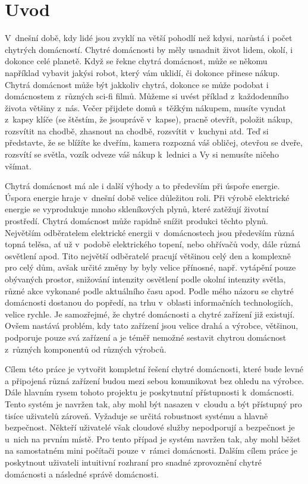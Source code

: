 \chapter{Uvod}

V~dnešní době, kdy lidé jsou zvyklí na větší pohodlí než kdysi, narůstá i počet chytrých domácností.
Chytré domácnosti by měly usnadnit život lidem, okolí, i dokonce celé planetě.
Když se řekne chytrá domácnost, může se někomu například vybavit jakýsi robot, který vám uklidí, či dokonce přinese nákup.
Chytrá domácnost může být jakkoliv chytrá, dokonce se může podobat i domácnostem z~různých sci-fi filmů.
Můžeme si uvést příklad z~každodenního života většiny z~nás.
Večer přijdete domů s~těžkým nákupem, musíte vyndat z~kapsy klíče (se štěstím, že jsouprávě v~kapse), pracně otevřít, položit nákup, rozsvítit na chodbě, zhasnout na chodbě,
rozsvítit v~kuchyni atd.
Teď si představte, že se blížíte ke dveřím, kamera rozpozná váš obličej, otevřou se dveře, rozsvítí se světla, vozík odveze váš nákup k~lednici a Vy si nemusíte ničeho všímat.

Chytrá domácnost má ale i další výhody a to především při úspoře energie.
Úspora energie hraje v~dnešní době velice důležitou roli.
Při výrobě elektrické energie se vyprodukuje mnoho skleníkových plynů, které zatěžují životní prostředí.
Chytrá domácnost může rapidně snížit produkci těchto plynů.
Největším odběratelem elektrické energii v~domácnostech jsou především různá topná telěsa, ať už v~podobě elektrického topení, nebo ohřívačů vody, dále různá osvětlení apod.
Tito největší odběratelé pracují většinou celý den a komplexně pro celý dům, avšak určité změny by byly velice přínosné, např. vytápění pouze obývaných prostor,
snižování intenzity osvětlení podle okolní intenzity světla, různé akce vykonané podle aktuálního času apod.
Podle mého názoru se chytré domácnosti dostanou do popředí, na trhu v~oblasti informačních technologiích, velice rychle.
Je samozřejmé, že chytré domácnosti a chytré zařízení již existují.
Ovšem nastává problém, kdy tato zařízení jsou velice drahá a výrobce, většinou, podporuje pouze svá zařízení a je téměř nemožné sestavit chytrou domácnost z~různých komponentů od různých výrobců.

Cílem této práce je vytvořit kompletní řešení chytré domácnosti, které bude levné a připojená různá zařízení budou mezi sebou komunikovat bez ohledu na výrobce.
Dále hlavním rysem tohoto projektu je poskytnutní přístupnosti k~domácnosti. Tento systém je navržen tak, aby mohl být nasazen v~cloudu a být přístupný pro tisíce uživatelů zároveň. Vyžaduje se určitá robustnost systému a hlavně bezpečnost.
Někteří uživatelé však cloudové služby nepodporují a bezpečnost je u~nich na prvním místě. Pro tento případ je systém navržen tak, aby mohl běžet na samostatném mini počítači pouze v~rámci domácnosti. Dalším cílem práce je poskytnout uživateli
intuitivní rozhraní pro snadné zprovoznění chytré domácnosti a následné správě domácnosti.

